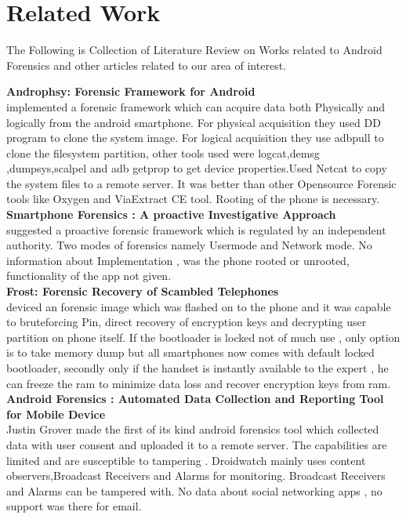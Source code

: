 \chapter{Related Work}
\label{chap:lit_review}
The Following is Collection of Literature Review on Works related to Android Forensics and other articles related to our area of interest.\\
\bigskip 

\textbf{Androphsy: Forensic Framework for Android }\\
\cite{akarawita_2015}  implemented a forensic framework which can acquire data both 
Physically and logically from the android smartphone. For physical acquisition they 
used DD program to clone the system image. For logical acquisition they use adbpull 
to clone the filesystem partition, other tools used were logcat,demsg ,dumpsys,scalpel 
and adb getprop to get device properties.Used Netcat to copy the system files to a 
remote server. It was better than other Opensource Forensic tools like Oxygen and 
ViaExtract CE tool. Rooting of the phone is necessary.\\

\textbf{Smartphone Forensics : A proactive Investigative Approach}\\
\cite{mylonas2012} suggested a proactive forensic framework which is regulated by an 
independent authority. Two modes of forensics namely Usermode and Network 
mode. No information about Implementation , was the phone rooted or unrooted, 
functionality of the app not given.\\ 

\textbf{Frost: Forensic Recovery of Scambled Telephones}\\
\cite{muller2013frost}deviced an forensic image which was flashed on to the phone and it was 
capable to bruteforcing Pin, direct recovery of encryption keys and decrypting user 
partition on phone itself. If the bootloader is locked not of much use , only option is 
to take memory dump but all smartphones now comes with default locked bootloader, secondly only if the handset is instantly available to the expert , he can freeze the ram to minimize 
data loss and recover encryption keys from ram.\\

\textbf{Android Forensics : Automated Data Collection and Reporting Tool for Mobile Device }\\
Justin Grover \cite{Grovera2013} made the first of its kind android forensics tool which collected data with user consent and uploaded it to a remote server. The capabilities are limited and are susceptible to tampering . Droidwatch mainly uses content observers,Broadcast Receivers and Alarms for monitoring. Broadcast Receivers and Alarms can be tampered with. No data about social networking apps , no support was there for email. \\


